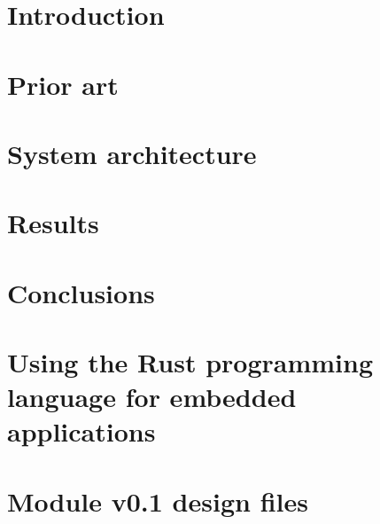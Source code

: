 \documentclass[oneside]{ctuthesis}
\begin{document}
\maketitle


\chapter{\label{chapter:introduction}Introduction}

\chapter{\label{chapter:prior}Prior art}

\chapter{\label{chapter:architecture}System architecture}

\chapter{\label{chapter:results}Results}

\chapter{Conclusions}
\printindex

\begin{appendices}
\chapter{\label{chapter:rust}Using the Rust programming language for embedded applications}

\chapter{\label{chapter:module01-files}Module v0.1 design files}

\end{appendices}



\end{document}
